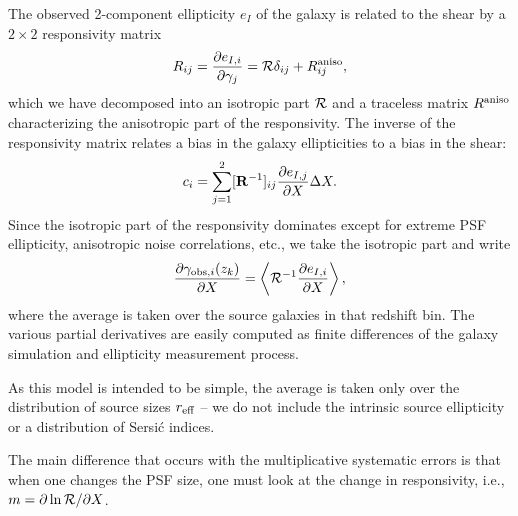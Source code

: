 \documentclass[usenatbib]{mnras}
\begin{document}
The observed 2-component ellipticity $e_I$ of the galaxy is related to
the shear by a $2\times 2$ responsivity matrix
\begin{equation}
R_{ij} = \frac{\partial e_{I,i}}{\partial\gamma_j} = {\cal R}\delta_{ij} + R^{\rm aniso}_{ij},
\end{equation}
which we have decomposed into an isotropic part ${\cal R}$ and a
traceless matrix $R^{\rm aniso}$ characterizing the anisotropic part
of the responsivity. The inverse of the responsivity matrix relates a
bias in the galaxy ellipticities to a bias in the shear:
\begin{equation}
c_i = \sum_{j=1}^2 [{\bf R}^{-1}]_{ij} \frac{\partial e_{I,j}}{\partial X} \Delta X.
\end{equation}
Since the isotropic part of the responsivity dominates except for
extreme PSF ellipticity, anisotropic noise correlations, etc., we take
the isotropic part and write
\begin{equation}
\frac{\partial\gamma_{{\rm obs},i}(z_k)}{\partial X} = \left\langle {\cal R}^{-1} \frac{\partial e_{I,i}}{\partial X} \right\rangle,
\end{equation}
where the average is taken over the source galaxies in that redshift
bin. The various partial derivatives are easily computed as finite
differences of the galaxy simulation and ellipticity measurement
process.

As this model is intended to be simple, the average is taken only over
the distribution of source sizes $r_{\rm eff}$ -- we do not include
the intrinsic source ellipticity or a distribution of Sersi\'c
indices.

The main difference that occurs with the multiplicative systematic errors is that when one changes the PSF size, one must look at the change in responsivity, i.e., $m = \partial \ln {\cal R}/\partial X$.

\end{document}
